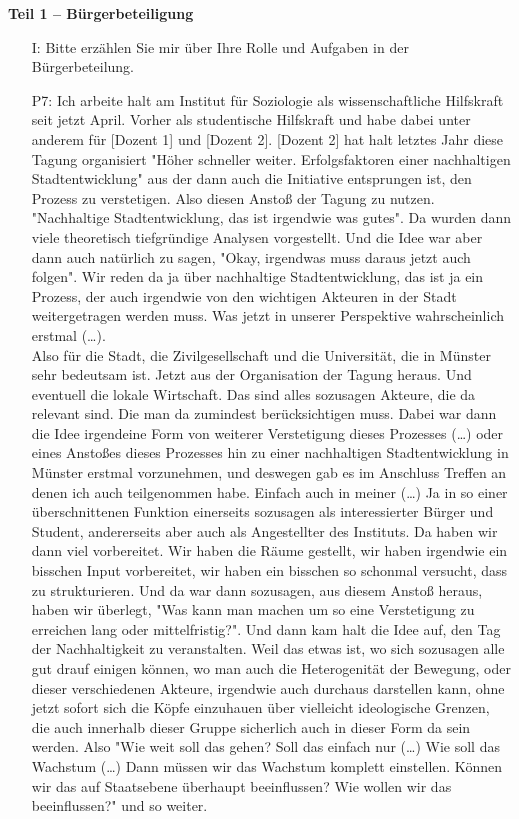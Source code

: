 \textbf{Teil 1 -- B{\"u}rgerbeteiligung}
\begin{itemize}
    \item[I:] Bitte erz{\"a}hlen Sie mir {\"u}ber Ihre Rolle und Aufgaben in der B{\"u}rgerbeteilung.
    \item[P7:] Ich arbeite halt am Institut f{\"u}r Soziologie als wissenschaftliche Hilfskraft seit jetzt April. Vorher als studentische Hilfskraft und habe dabei unter anderem f{\"u}r [Dozent 1] und [Dozent 2]. [Dozent 2] hat halt letztes Jahr diese Tagung organisiert "H{\"o}her schneller weiter. Erfolgsfaktoren einer nachhaltigen Stadtentwicklung" aus der dann auch die Initiative entsprungen ist, den Prozess zu verstetigen. Also diesen Ansto{\ss} der Tagung zu nutzen. "Nachhaltige Stadtentwicklung, das ist irgendwie was gutes". Da wurden dann viele theoretisch tiefgr{\"u}ndige Analysen vorgestellt. Und die Idee war aber dann auch nat{\"u}rlich zu sagen, "Okay, irgendwas muss daraus jetzt auch folgen". Wir reden da ja {\"u}ber nachhaltige Stadtentwicklung, das ist ja ein Prozess, der auch irgendwie von den wichtigen Akteuren in der Stadt weitergetragen werden muss. Was jetzt in unserer Perspektive wahrscheinlich erstmal (\dots).\\
    Also f{\"u}r die Stadt, die Zivilgesellschaft und die Universit{\"a}t, die in M{\"u}nster sehr bedeutsam ist. Jetzt aus der Organisation der Tagung heraus. Und eventuell die lokale Wirtschaft. Das sind alles sozusagen Akteure, die da relevant sind. Die man da zumindest ber{\"u}cksichtigen muss. Dabei war dann die Idee irgendeine Form von weiterer Verstetigung dieses Prozesses (\dots) oder eines Ansto{\ss}es dieses Prozesses hin zu einer nachhaltigen Stadtentwicklung in M{\"u}nster erstmal vorzunehmen, und deswegen gab es im Anschluss Treffen an denen ich auch teilgenommen habe. Einfach auch in meiner (\dots) Ja in so einer {\"u}berschnittenen Funktion einerseits sozusagen als interessierter B{\"u}rger und Student, andererseits aber auch als Angestellter des Instituts. Da haben wir dann viel vorbereitet. Wir haben die R{\"a}ume gestellt, wir haben irgendwie ein bisschen Input vorbereitet, wir haben ein bisschen so schonmal versucht, dass zu strukturieren. Und da war dann sozusagen, aus diesem Ansto{\ss} heraus, haben wir {\"u}berlegt, "Was kann man machen um so eine Verstetigung zu erreichen lang oder mittelfristig?". Und dann kam halt die Idee auf, den Tag der Nachhaltigkeit zu veranstalten. Weil das etwas ist, wo sich sozusagen alle gut drauf einigen k{\"o}nnen, wo man auch die Heterogenit{\"a}t der Bewegung, oder dieser verschiedenen Akteure, irgendwie auch durchaus darstellen kann, ohne jetzt sofort sich die K{\"o}pfe einzuhauen {\"u}ber vielleicht ideologische Grenzen, die auch innerhalb dieser Gruppe sicherlich auch in dieser Form da sein werden. Also "Wie weit soll das gehen? Soll das einfach nur (\dots) Wie soll das Wachstum (\dots) Dann m{\"u}ssen wir das Wachstum komplett einstellen. K{\"o}nnen wir das auf Staatsebene {\"u}berhaupt beeinflussen? Wie wollen wir das beeinflussen?" und so weiter.\\

\end{itemize}

